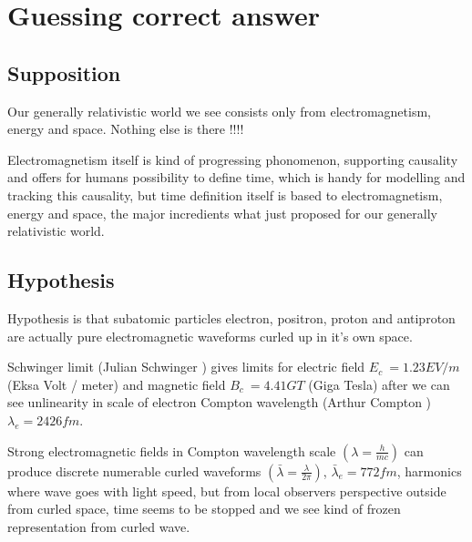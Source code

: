 %
%
%
\begin{comment}\end{comment}
\chapter{Guessing correct answer}
\section{Supposition}
\label{supposition}
Our generally relativistic world we see consists only from electromagnetism,
energy and space. Nothing else is there !!!!

Electromagnetism itself is kind of progressing phonomenon, supporting causality
and offers for humans possibility to define time, which is handy for modelling
and tracking this causality, but time definition itself is based to
electromagnetism, energy and space, the major incredients what just proposed
for our generally relativistic world.

\section{Hypothesis}
\label{hypothesis}

Hypothesis is that subatomic particles electron, positron, proton and
antiproton are actually pure electromagnetic waveforms curled up in it's own
space.

Schwinger limit (Julian Schwinger \cite{SchwingerLimit}) gives limits for
electric field $E_c~=1.23 EV/m$ (Eksa Volt / meter) and magnetic field
$B_c~=4.41 GT$ (Giga Tesla) after we can see unlinearity in scale of
electron Compton wavelength (Arthur Compton \cite{ComptonWavelength}) 
$\lambda_e=2426 fm$.


Strong electromagnetic fields in Compton wavelength scale
$(\lambda=\frac{h}{mc})$
can produce discrete numerable curled waveforms
$(\bar{\lambda}=\frac{\lambda}{2\pi})$,
$\bar{\lambda}_e=772 fm$,
harmonics where wave goes with light speed, but from local observers
perspective outside from curled space, time seems to be stopped and we see kind
of frozen representation from curled wave.


